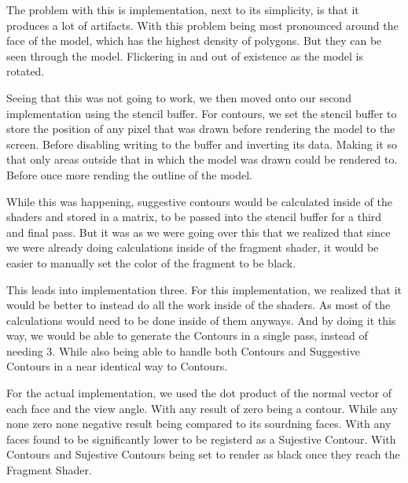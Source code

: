 The problem with this is implementation, next to its simplicity, is that it produces a lot of artifacts. With this problem being most pronounced around the face of the model, which has the highest density of polygons. But they can be seen through the model. Flickering in and out of existence as the model is rotated.

Seeing that this was not going to work, we then moved onto our second implementation using the stencil buffer. For contours, we set the stencil buffer to store the position of any pixel that was drawn before rendering the model to the screen. Before disabling writing to the buffer and inverting its data. Making it so that only areas outside that in which the model was drawn could be rendered to. Before once more rending the outline of the model.

While this was happening, suggestive contours would be calculated inside of the shaders and stored in a matrix, to be passed into the stencil buffer for a third and final pass. But it was as we were going over this that we realized that since we were already doing calculations inside of the fragment shader, it would be easier to manually set the color of the fragment to be black.

This leads into implementation three. For this implementation, we realized that it would be better to instead do all the work inside of the shaders. As most of the calculations would need to be done inside of them anyways. And by doing it this way, we would be able to generate the Contours in a single pass, instead of needing 3. While also being able to handle both Contours and Suggestive Contours in a near identical way to Contours.

For the actual implementation, we used the dot product of the normal vector of each face and the view angle. With any result of zero being a contour. While any none zero none negative result being compared to its sourdning faces. With any faces found to be significantly lower to be registerd as a Sujestive Contour. With Contours and Sujestive Contours being set to render as black once they reach the Fragment Shader.